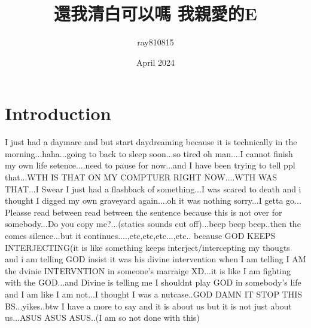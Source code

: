 \documentclass{article}
\title{還我清白可以嗎 我親愛的E}
\author{ray810815 }
\date{April 2024}
\begin{document}
\maketitle

\section{Introduction}
I just had a daymare and but start daydreaming because it is technically in the morning...haha...going to back to sleep soon...so tired oh man....I cannot finish my own life setence....need to pause for now...and I have been trying to tell
ppl that...WTH IS THAT ON MY COMPTUER RIGHT NOW....WTH WAS THAT...I Swear I just had a flashback of something...I was scared to death and i thought I digged my own graveyard  again....oh it was nothing sorry...I getta go...
Pleasse read between read between the sentence because this is not over for somebody...Do you copy me?...(statics sounds cut off)...beep beep beep..then the comes silence...but it continues....,etc,etc,etc...,etc..
because GOD KEEPS INTERJECTING(it is like something keeps interject/intercepting my thougts and i am telling GOD insist it was his divine intervention when I am telling I AM the dvinie INTERVNTION in someone's marraige XD...it is like I am fighting with the GOD...and Divine is telling me I shouldnt play GOD in somebody's life and I am like I am not...I thought I was a nutcase..GOD DAMN IT STOP THIS BS...yikes..btw I have a more to say and it is about us but it is not just about us...ASUS ASUS ASUS..(I am so not done with this)
\end{document}
